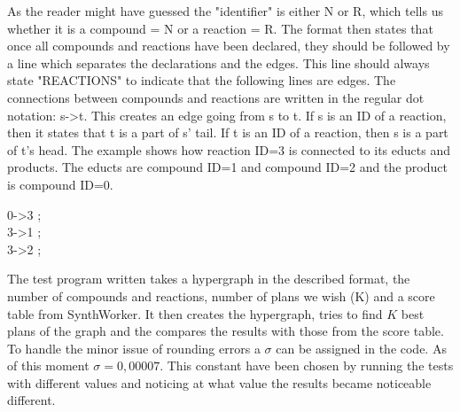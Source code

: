 \documentclass[a4paper,10pt,titlepage]{paper}
\begin{document}
As the reader might have guessed the "identifier" is either N or R, which tells us whether it is a compound = N or a reaction = R. The format then states that once all compounds and reactions have been declared, they should be followed by a line which separates the declarations and the edges. This line should always state "REACTIONS" to indicate that the following lines are edges. The connections between compounds and reactions are written in the regular dot notation: s->t. This creates an edge going from s to t. If s is an ID of a reaction, then it states that t is a part of s' tail. If t is an ID of a reaction, then s is a part of t's head. The example shows how reaction ID=3 is connected to its educts and products. The educts are compound ID=1 and compound ID=2 and the product is compound ID=0.
\begin{center}
0->3 ;\\
3->1 ;\\
3->2 ;\\
\end{center}
The test program written takes a hypergraph in the described format, the number of compounds and reactions, number of plans we wish (K) and a score table from SynthWorker. It then creates the hypergraph, tries to find $K$ best plans of the graph and the compares the results with those from the score table. To handle the minor issue of rounding errors a $\sigma$ can be assigned in the code. As of this moment $\sigma = 0,00007$. This constant have been chosen by running the tests with different values and noticing at what value the results became noticeable different.\\
\end{document}
